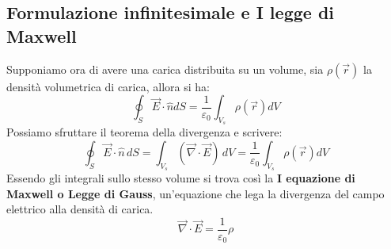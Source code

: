 \documentclass{book}
\begin{document}
\subsection{Formulazione infinitesimale e I legge di Maxwell}
Supponiamo ora di avere una carica distribuita su un volume, sia $\rho(\vec{r})$ la densità volumetrica di carica, allora si ha:
$$
\oint_{S}\vec{E}\cdot \hat{n}d{S} = \frac{1}{\varepsilon_0}\int_{V_s} \rho(\vec{r})d{V}
$$
Possiamo sfruttare il teorema della divergenza e scrivere:
$$
\oint_{S} \vec{E} \cdot \hat{n}\, dS = \int_{V_s} (\vec{\nabla} \cdot \vec{E})\, dV = \frac{1}{\varepsilon_0}\int_{V_s} \rho(\vec{r})d{V}
$$
Essendo gli integrali sullo stesso volume si trova così la \textbf{I equazione di Maxwell o Legge di Gauss}, un'equazione che lega la divergenza del campo elettrico alla densità di carica.
$$
\boxed{
\vec{\nabla} \cdot \vec{E} = \frac{1}{\varepsilon_0} \rho
}
$$
\end{document}

